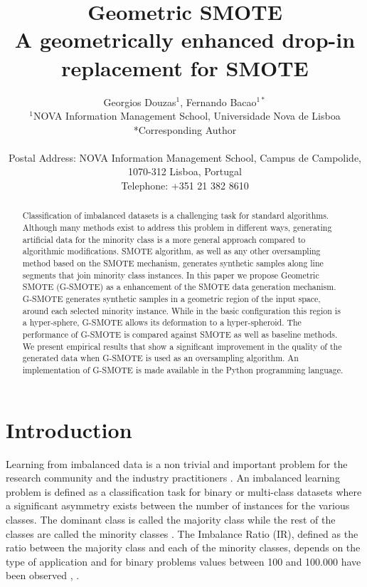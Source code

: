 \documentclass[parskip=full]{scrartcl}
\title{Geometric SMOTE \\ \LARGE{A geometrically enhanced drop-in replacement for SMOTE}}
\author{
	Georgios Douzas\(^{1}\), Fernando Bacao\(^{1*}\)
	\\
	\small{\(^{1}\)NOVA Information Management School, Universidade Nova de Lisboa}
	\\
	\small{*Corresponding Author}
	\\
	\\
	\small{Postal Address: NOVA Information Management School, Campus de Campolide, 1070-312 Lisboa, Portugal}
	\\
	\small{Telephone: +351 21 382 8610}
}
\date{}
\begin{document}
\maketitle

\begin{abstract}
Classification of imbalanced datasets is a challenging task for standard
algorithms. Although many methods exist to address this problem in different
ways, generating artificial data for the minority class is a more general
approach compared to algorithmic modifications. SMOTE algorithm, as well as any
other oversampling method based on the SMOTE mechanism, generates synthetic
samples along line segments that join minority class instances. In this paper we
propose Geometric SMOTE (G-SMOTE) as a enhancement of the SMOTE data generation
mechanism. G-SMOTE generates synthetic samples in a geometric region of the
input space, around each selected minority instance. While in the basic
configuration this region is a hyper-sphere, G-SMOTE allows its deformation to a
hyper-spheroid. The performance of G-SMOTE is compared against SMOTE as well as
baseline methods. We present empirical results that show a significant
improvement in the quality of the generated data when G-SMOTE is used as an
oversampling algorithm. An implementation of G-SMOTE is made available in the
Python programming language.
\end{abstract}

\section{Introduction}
Learning from imbalanced data is a non trivial and important problem for the
research community and the industry practitioners \cite{Chawla2003}. An
imbalanced learning problem is defined as a classification task for binary or
multi-class datasets where a significant asymmetry exists between the number of
instances for the various classes. The dominant class is called the majority
class while the rest of the classes are called the minority classes
\cite{Chawla2003}. The Imbalance Ratio (IR), defined as the ratio between the
majority class and each of the minority classes, depends on the type of
application and for binary problems values between 100 and 100.000 have been
observed \cite{Chawla2002}, \cite{Barua2014}.
\end{document}
